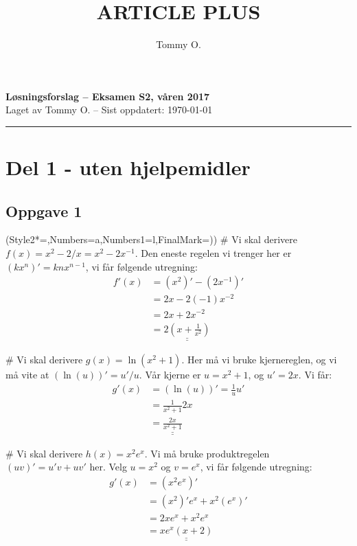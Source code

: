 \documentclass[12pt, a4paper]
{article}						%
\title{ARTICLE PLUS}
\author{Tommy O.}
\def\answer#1{\underline{\underline{#1}}}
\begin{document}
	\pagestyle{fancy}
	{\bfseries \Large Løsningsforslag -- Eksamen S2, våren 2017} \\
	{ \footnotesize Laget av Tommy O. -- Sist oppdatert: \today}
	\hrule
	
\section*{Del 1 - uten hjelpemidler}
\subsection*{Oppgave 1}
\begin{easylist}[enumerate]
	\ListProperties(Style2*=,Numbers=a,Numbers1=l,FinalMark={)})
	# Vi skal derivere $f(x) = x^2 - 2/x = x^2 - 2x^{-1}$.
	Den eneste regelen vi trenger her er $\left(kx^n\right)' = knx^{n-1}$, vi får følgende utregning:
	\begin{align*}
		f'(x) &= \left(x^2\right)' - \left(2x^{-1}\right)' \\
			&= 2x - 2(-1)x^{-2} \\
			&= 2x + 2x^{-2} \\
			&= \answer{2 \left( x + \frac{1}{x^2}\right)}
	\end{align*}
	
	# Vi skal derivere $g(x) = \ln \left( x^2 + 1\right)$. Her må vi bruke kjernereglen, og vi må vite at $\left( \ln (u)\right)' = u'/u$. Vår kjerne er $u = x^2 + 1$, og $u' = 2x$. Vi får:
	\begin{align*}
	g'(x) &= \left( \ln (u)\right)' = \frac{1}{u} u' \\
	&= \frac{1}{x^2 + 1} 2x \\
	&= \answer{\frac{2x}{x^2 + 1}  }
	\end{align*}
	
	# Vi skal derivere $h(x) = x^2 e^x$. Vi må bruke produktregelen $\left(uv\right)' = u'v + uv'$ her. Velg $u = x^2$ og $v = e^x$, vi får følgende utregning:
	\begin{align*}
	g'(x) &= \left( x^2 e^x \right)' \\
	&= \left( x^2  \right)' e^x + x^2 \left( e^x\right)' \\
	&= 2x e^x + x^2 e^x \\
	&= \answer{x e^x \left(x+2\right)}
	\end{align*}
\end{easylist}
\end{document}
